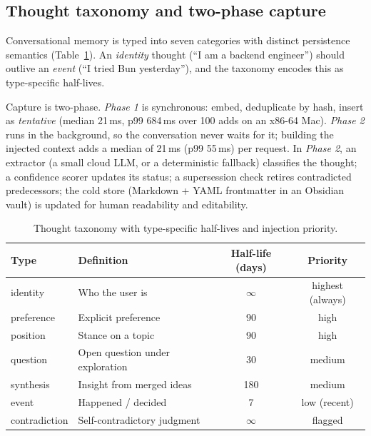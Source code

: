 \documentclass[11pt]{article}
\begin{document}
\subsection{Thought taxonomy and two-phase capture}
\label{sec:taxonomy}

Conversational memory is typed into seven categories with distinct
persistence semantics (Table~\ref{tab:thought_types}). An \emph{identity}
thought (``I am a backend engineer'') should outlive an \emph{event}
(``I tried Bun yesterday''), and the taxonomy encodes this as type-specific
half-lives.

Capture is two-phase. \emph{Phase 1} is synchronous: embed, deduplicate by
hash, insert as \emph{tentative} (median 21\,ms, p99 684\,ms over 100 adds on
an x86-64 Mac). \emph{Phase 2} runs in the background, so the conversation
never waits for it; building the injected context adds a median of 21\,ms
(p99 55\,ms) per request. In \emph{Phase 2}, an extractor (a
small cloud LLM, or a deterministic fallback) classifies the thought; a
confidence scorer updates its status; a supersession check retires
contradicted predecessors; the cold store (Markdown + YAML frontmatter in an
Obsidian vault) is updated for human readability and editability.

\begin{table}[!htbp]
  \centering
  \caption{Thought taxonomy with type-specific half-lives and injection priority.}
  \label{tab:thought_types}
  \begin{tabular}{llcc}
    \toprule
    \textbf{Type} & \textbf{Definition} & \textbf{Half-life (days)} & \textbf{Priority} \\
    \midrule
    identity      & Who the user is                 & $\infty$ & highest (always) \\
    preference    & Explicit preference             & 90       & high \\
    position      & Stance on a topic               & 90       & high \\
    question      & Open question under exploration & 30       & medium \\
    synthesis     & Insight from merged ideas       & 180      & medium \\
    event         & Happened / decided              & 7        & low (recent) \\
    contradiction & Self-contradictory judgment     & $\infty$ & flagged \\
    \bottomrule
  \end{tabular}
\end{table}
\end{document}
